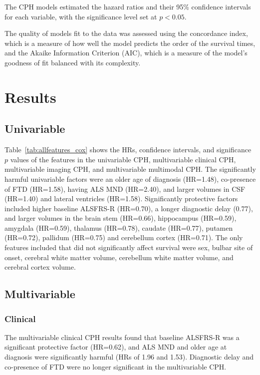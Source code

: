 The CPH models estimated the hazard ratios and their 95\% confidence intervals for each variable, with the significance level set at $p<0.05$.

The quality of models fit to the data was assessed using the concordance index, which is a measure of how well the model predicts the order of the survival times, and the Akaike Information Criterion (AIC), which is a measure of the model's goodness of fit balanced with its complexity.

\section{Results}

\subsection{Univariable}



Table~\ref{tab:allfeatures_cox} shows the HRs, confidence intervals, and significance $p$ values of the features in the univariable CPH, multivariable clinical CPH, multivariable imaging CPH, and multivariable multimodal CPH.
The significantly harmful univariable factors were an older age of diagnosis (HR=1.48), co-presence of FTD (HR=1.58), having ALS MND (HR=2.40), and larger volumes in CSF (HR=1.40) and lateral ventricles (HR=1.58).
Significantly protective factors included higher baseline ALSFRS-R (HR=0.70), a longer diagnostic delay (0.77), and larger volumes in the brain stem (HR=0.66), hippocampus (HR=0.59), amygdala (HR=0.59), thalamus (HR=0.78), caudate (HR=0.77), putamen (HR=0.72), pallidum (HR=0.75) and cerebellum cortex (HR=0.71).
The only features included that did not significantly affect survival were sex, bulbar site of onset, cerebral white matter volume, cerebellum white matter volume, and cerebral cortex volume.


\subsection{Multivariable}

\subsubsection{Clinical}
The multivariable clinical CPH results found that baseline ALSFRS-R was a significant protective factor (HR=0.62), and ALS MND and older age at diagnosis were significantly harmful (HRs of 1.96 and 1.53).
Diagnostic delay and co-presence of FTD were no longer significant in the multivariable CPH.

